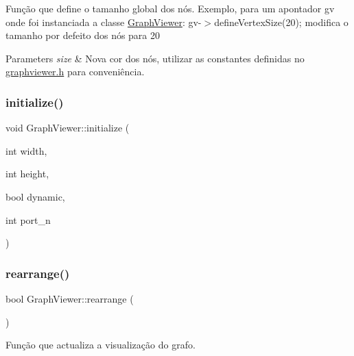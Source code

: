 Função que define o tamanho global dos nós. Exemplo, para um apontador gv onde foi instanciada a classe \mbox{\hyperlink{class_graph_viewer}{Graph\+Viewer}}\+: gv-\/$>$define\+Vertex\+Size(20); modifica o tamanho por defeito dos nós para 20


\begin{DoxyParams}{Parameters}
{\em size} & Nova cor dos nós, utilizar as constantes definidas no \mbox{\hyperlink{graphviewer_8h}{graphviewer.\+h}} para conveniência. \\
\hline
\end{DoxyParams}
\mbox{\label{class_graph_viewer_a1ce9dff4903c650d3b2d33a3ef1d1f61}} 
\subsubsection{\texorpdfstring{initialize()}{initialize()}}
{\footnotesize\ttfamily void Graph\+Viewer\+::initialize (\begin{DoxyParamCaption}\item[{int}]{width,  }\item[{int}]{height,  }\item[{bool}]{dynamic,  }\item[{int}]{port\+\_\+n }\end{DoxyParamCaption})\hspace{0.3cm}{\ttfamily [private]}}

\mbox{\label{class_graph_viewer_a3009a66958686ccb7e78b68e37c3c423}} 
\subsubsection{\texorpdfstring{rearrange()}{rearrange()}}
{\footnotesize\ttfamily bool Graph\+Viewer\+::rearrange (\begin{DoxyParamCaption}{ }\end{DoxyParamCaption})}

Função que actualiza a visualização do grafo. \mbox{\label{class_graph_viewer_a9a8ee68c7c12b373affbe4069dd95d72}} 
